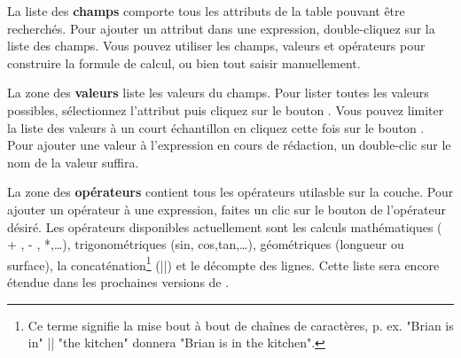 La liste des \textbf{champs} comporte tous les attributs de la table pouvant être recherchés. Pour ajouter un attribut dans une expression, double-cliquez sur la liste des champs. Vous pouvez utiliser les champs, valeurs et opérateurs pour construire la formule de calcul, ou bien tout saisir manuellement.

La zone des \textbf{valeurs} liste les valeurs du champs. Pour lister toutes les valeurs possibles, sélectionnez l'attribut puis cliquez sur le bouton . Vous pouvez limiter la liste des valeurs à un court échantillon en cliquez cette fois sur le bouton . Pour ajouter une valeur à l'expression en cours de rédaction, un double-clic sur le nom de la valeur suffira.

La zone des \textbf{opérateurs} contient tous les opérateurs utilasble sur la couche. Pour ajouter un opérateur à une expression, faites un clic sur le bouton de l'opérateur désiré. Les opérateurs disponibles actuellement sont les calculs mathématiques ( + , - , *,\dots), trigonométriques (sin, cos,tan,\dots), géométriques (longueur ou surface), la concaténation\footnote{Ce terme signifie la mise bout à bout de chaînes de caractères, p. ex. "Brian is in" || "the kitchen" donnera "Brian is in the kitchen".} (||) et le décompte des lignes. Cette liste sera encore étendue dans les prochaines versions de \qg.

